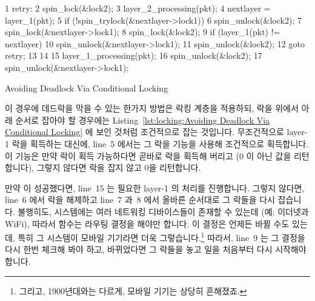 \begin{listing}[tbp]
{ \scriptsize
\begin{verbbox}
  1 retry:
  2   spin_lock(&lock2);
  3   layer_2_processing(pkt);
  4   nextlayer = layer_1(pkt);
  5   if (!spin_trylock(&nextlayer->lock1)) {
  6     spin_unlock(&lock2);
  7     spin_lock(&nextlayer->lock1);
  8     spin_lock(&lock2);
  9     if (layer_1(pkt) != nextlayer) {
 10       spin_unlock(&nextlayer->lock1);
 11       spin_unlock(&lock2);
 12       goto retry;
 13     }
 14   }
 15   layer_1_processing(pkt);
 16 spin_unlock(&lock2);
 17 spin_unlock(&nextlayer->lock1);
\end{verbbox}
}
\centering
\theverbbox
\caption{Avoiding Deadlock Via Conditional Locking}
\label{lst:locking:Avoiding Deadlock Via Conditional Locking}
\end{listing}

이 경우에 데드락을 막을 수 있는 한가지 방법은 락킹 계층을 적용하되, 락을 위에서
아래 순서로 잡아야 할 경우에는 
Listing~\ref{lst:locking:Avoiding Deadlock Via Conditional Locking} 에 보인
것처럼 조건적으로 잡는 것입니다.
무조건적으로 layer-1 락을 획득하는 대신에, line~5 에서는 그 락을
 기능을 사용해 조건적으로 획득합니다.
이 기능은 만약 락이 획득 가능하다면 곧바로 락을 획득해 버리고 (0 이 아닌 값을
리턴합니다), 그렇지 않다면 락을 잡지 않고 0을 리턴합니다.

만약  이 성공했다면, line~15 는 필요한 layer-1 의 처리를
진행합니다.
그렇지 않다면, line~6 에서 락을 해제하고 line~7 과~8 에서 올바른 순서대로 그
락들을 다시 잡습니다.
불행히도, 시스템에는 여러 네트워킹 디바이스들이 존재할 수 있는데 (예: 이더넷과
WiFi), 따라서  함수는 라우팅 결정을 해야만 합니다.
이 결정은 언제든 바뀔 수도 있는데, 특히 그 시스템이 모바일 기기라면 더욱
그렇습니다.\footnote{
	그리고, 1900년대와는 다르게, 모바일 기기는 상당히 흔해졌죠.}
따라서, line~9 는 그 결정을 다시 한번 체크해 봐야 하고, 바뀌었다면 그 락들을
놓고 일을 처음부터 다시 시작해야 합니다.
\iffalse


